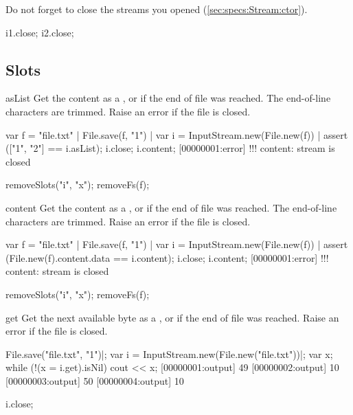 Do not forget to close the streams you opened
(\autoref{sec:specs:Stream:ctor}).

\begin{urbiscript}
i1.close;
i2.close;
\end{urbiscript}

\subsection{Slots}

\begin{urbiscriptapi}
\item[asList]%
  Get the content as a , or  if
  the end of file was reached.  The end-of-line characters are trimmed.
  Raise an error if the file is closed.
\begin{urbiscript}
var f = "file.txt" |
File.save(f, "1\n") |
var i = InputStream.new(File.new(f)) |
assert (["1", "2"] == i.asList);
i.close;
i.content;
[00000001:error] !!! content: stream is closed
\end{urbiscript}
\begin{urbicomment}
removeSlots("i", "x");
removeFs(f);
\end{urbicomment}

\item[content]%
  Get the content as a , or  if
  the end of file was reached.  The end-of-line characters are trimmed.
  Raise an error if the file is closed.
\begin{urbiscript}
var f = "file.txt" |
File.save(f, "1\n") |
var i = InputStream.new(File.new(f)) |
assert (File.new(f).content.data == i.content);
i.close;
i.content;
[00000001:error] !!! content: stream is closed
\end{urbiscript}
\begin{urbicomment}
removeSlots("i", "x");
removeFs(f);
\end{urbicomment}

\item[get]%
  Get the next available byte as a , or  if
  the end of file was reached.  Raise an error if the file is closed.
\begin{urbiscript}
File.save("file.txt", "1\n")|;
var i = InputStream.new(File.new("file.txt"))|;
var x;
while (!(x = i.get).isNil)
  cout << x;
[00000001:output] 49
[00000002:output] 10
[00000003:output] 50
[00000004:output] 10

i.close;


\end{urbiscript}
\end{urbiscriptapi}
